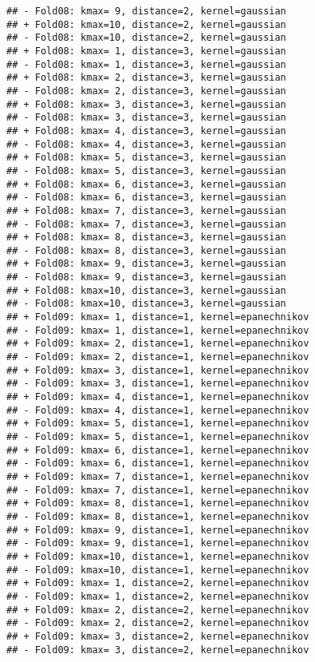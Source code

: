 \documentclass[
]{article}
\begin{document}
\begin{verbatim}
## - Fold08: kmax= 9, distance=2, kernel=gaussian 
## + Fold08: kmax=10, distance=2, kernel=gaussian 
## - Fold08: kmax=10, distance=2, kernel=gaussian 
## + Fold08: kmax= 1, distance=3, kernel=gaussian 
## - Fold08: kmax= 1, distance=3, kernel=gaussian 
## + Fold08: kmax= 2, distance=3, kernel=gaussian 
## - Fold08: kmax= 2, distance=3, kernel=gaussian 
## + Fold08: kmax= 3, distance=3, kernel=gaussian 
## - Fold08: kmax= 3, distance=3, kernel=gaussian 
## + Fold08: kmax= 4, distance=3, kernel=gaussian 
## - Fold08: kmax= 4, distance=3, kernel=gaussian 
## + Fold08: kmax= 5, distance=3, kernel=gaussian 
## - Fold08: kmax= 5, distance=3, kernel=gaussian 
## + Fold08: kmax= 6, distance=3, kernel=gaussian 
## - Fold08: kmax= 6, distance=3, kernel=gaussian 
## + Fold08: kmax= 7, distance=3, kernel=gaussian 
## - Fold08: kmax= 7, distance=3, kernel=gaussian 
## + Fold08: kmax= 8, distance=3, kernel=gaussian 
## - Fold08: kmax= 8, distance=3, kernel=gaussian 
## + Fold08: kmax= 9, distance=3, kernel=gaussian 
## - Fold08: kmax= 9, distance=3, kernel=gaussian 
## + Fold08: kmax=10, distance=3, kernel=gaussian 
## - Fold08: kmax=10, distance=3, kernel=gaussian 
## + Fold09: kmax= 1, distance=1, kernel=epanechnikov 
## - Fold09: kmax= 1, distance=1, kernel=epanechnikov 
## + Fold09: kmax= 2, distance=1, kernel=epanechnikov 
## - Fold09: kmax= 2, distance=1, kernel=epanechnikov 
## + Fold09: kmax= 3, distance=1, kernel=epanechnikov 
## - Fold09: kmax= 3, distance=1, kernel=epanechnikov 
## + Fold09: kmax= 4, distance=1, kernel=epanechnikov 
## - Fold09: kmax= 4, distance=1, kernel=epanechnikov 
## + Fold09: kmax= 5, distance=1, kernel=epanechnikov 
## - Fold09: kmax= 5, distance=1, kernel=epanechnikov 
## + Fold09: kmax= 6, distance=1, kernel=epanechnikov 
## - Fold09: kmax= 6, distance=1, kernel=epanechnikov 
## + Fold09: kmax= 7, distance=1, kernel=epanechnikov 
## - Fold09: kmax= 7, distance=1, kernel=epanechnikov 
## + Fold09: kmax= 8, distance=1, kernel=epanechnikov 
## - Fold09: kmax= 8, distance=1, kernel=epanechnikov 
## + Fold09: kmax= 9, distance=1, kernel=epanechnikov 
## - Fold09: kmax= 9, distance=1, kernel=epanechnikov 
## + Fold09: kmax=10, distance=1, kernel=epanechnikov 
## - Fold09: kmax=10, distance=1, kernel=epanechnikov 
## + Fold09: kmax= 1, distance=2, kernel=epanechnikov 
## - Fold09: kmax= 1, distance=2, kernel=epanechnikov 
## + Fold09: kmax= 2, distance=2, kernel=epanechnikov 
## - Fold09: kmax= 2, distance=2, kernel=epanechnikov 
## + Fold09: kmax= 3, distance=2, kernel=epanechnikov 
## - Fold09: kmax= 3, distance=2, kernel=epanechnikov 

\end{verbatim}
\end{document}
